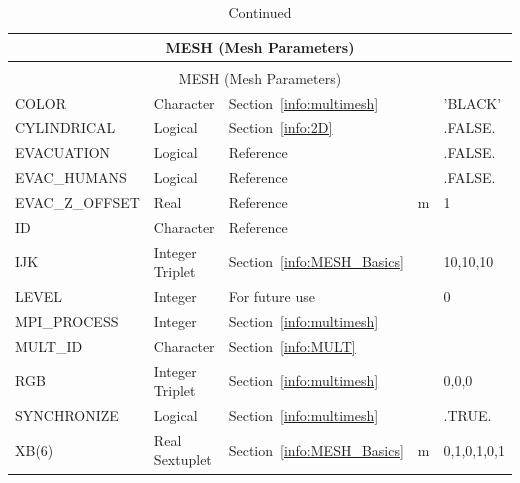 \documentclass[11pt]{book}
\begin{document}
\begin{longtable}{@{\extracolsep{\fill}}|l|l|l|l|l|}
\caption[Mesh parameters ({\ct MESH} namelist group)]{For more information see Section~\ref{info:MESH}.}
\label{tbl:MESH} \\
\hline
\multicolumn{5}{|c|}{{\ct MESH} (Mesh Parameters)} \\
\hline \hline
\endfirsthead
\caption[]{Continued} \\
\hline
\multicolumn{5}{|c|}{{\ct MESH} (Mesh Parameters)} \\
\hline \hline
\endhead
{\ct COLOR}             & Character                     & Section~\ref{info:multimesh}              &    & {\ct 'BLACK'}    \\ \hline
{\ct CYLINDRICAL}       & Logical                       & Section~\ref{info:2D}                     &    & {\ct .FALSE.}    \\ \hline
{\ct EVACUATION}        & Logical                       & Reference~\cite{FDS_Evac_Users_Guide}     &    & {\ct .FALSE.}    \\ \hline
{\ct EVAC\_HUMANS}      & Logical                       & Reference~\cite{FDS_Evac_Users_Guide}     &    & {\ct .FALSE.}    \\ \hline
{\ct EVAC\_Z\_OFFSET}   & Real                          & Reference~\cite{FDS_Evac_Users_Guide}     & m  & 1                \\ \hline
{\ct ID}                & Character                     & Reference~\cite{FDS_Evac_Users_Guide}     &    &                  \\ \hline
{\ct IJK}               & Integer Triplet               & Section~\ref{info:MESH_Basics}            &    & 10,10,10         \\ \hline
{\ct LEVEL}             & Integer                       & For future use                            &    & 0                \\ \hline
{\ct MPI\_PROCESS}      & Integer                       & Section~\ref{info:multimesh}              &    &                  \\ \hline
{\ct MULT\_ID }         & Character                     & Section~\ref{info:MULT}                   &    &                  \\ \hline
{\ct RGB}               & Integer Triplet               & Section~\ref{info:multimesh}              &    & 0,0,0            \\ \hline
{\ct SYNCHRONIZE}       & Logical                       & Section~\ref{info:multimesh}              &    & {\ct .TRUE.}     \\ \hline
{\ct XB(6)}             & Real Sextuplet                & Section~\ref{info:MESH_Basics}            & m  & 0,1,0,1,0,1      \\ \hline
\end{longtable}
\end{document}

